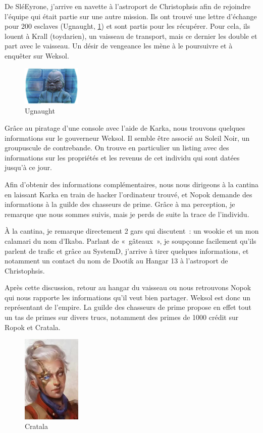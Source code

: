 \documentclass[a4paper,9pt,twoside,twocolumn,openany]{book}
\begin{document}
De SléEyrone, j'arrive en navette à l'astroport de Christophsis afin de rejoindre l'équipe qui était partie sur une autre mission. Ils ont trouvé une lettre d'échange pour 200 esclaves (Ugnaught, \ref{ugnaught}) et sont partis pour les récupérer. Pour cela, ils louent à Krall (toydarien), un vaisseau de transport, mais ce dernier les double et part avec le vaisseau. Un désir de vengeance les mène à le poursuivre et à enquêter sur Weksol.

\begin{figure}
    \includegraphics[width=0.25\textwidth]{img/ugnaught.png}
    \caption{Ugnaught}
    \label{ugnaught}
\end{figure}

Grâce au piratage d’une console avec l'aide de Karka, nous trouvons quelques informations sur le gouverneur Weksol. Il semble être associé au Soleil Noir, un groupuscule de contrebande. On trouve en particulier un listing avec des informations sur les propriétés et les revenus de cet individu qui sont datées jusqu’à ce jour.

Afin d’obtenir des informations complémentaires, nous nous dirigeons à la cantina en laissant Karka en train de hacker l’ordinateur trouvé, et Nopok demande des informations à la guilde des chasseurs de prime. Grâce à ma perception, je remarque que nous sommes suivis, mais je perds de suite la trace de l’individu.

À la cantina, je remarque directement 2 gars qui discutent\ : un wookie et un mon calamari du nom d’Ikaba. Parlant de «\ gâteaux\ », je soupçonne facilement qu'ils parlent de trafic et grâce au SystemD, j’arrive à tirer quelques informations, et notamment un contact du nom de Dootik au Hangar 13 à l'astroport de Christophsis.

Après cette discussion, retour au hangar du vaisseau ou nous retrouvons Nopok qui nous rapporte les informations qu'il veut bien partager. Weksol est donc un représentant de l'empire. La guilde des chasseurs de prime propose en effet tout un tas de primes sur divers trucs, notamment des primes de 1000 crédit sur Ropok et Cratala.

\begin{figure}
    \includegraphics[width=0.25\textwidth]{img/cratala.jpg}
    \caption{Cratala}
\end{figure}
\end{document}
